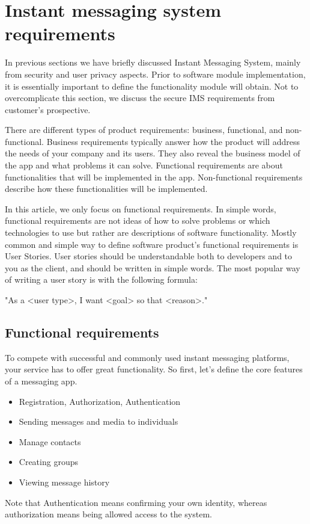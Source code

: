 \chapter{Instant messaging system requirements}\label{ch:instant-messaging-system-requirements}

In previous sections we have briefly discussed Instant Messaging System, mainly from security and user privacy aspects.
Prior to software module implementation, it is essentially important to define the functionality module will obtain.
Not to overcomplicate this section, we discuss the secure IMS requirements from customer's prospective.

There are different types of product requirements: business, functional, and non-functional.
Business requirements typically answer how the product will address the needs of your company and its users.
They also reveal the business model of the app and what problems it can solve.
Functional requirements are about functionalities that will be implemented in the app.
Non-functional requirements describe how these functionalities will be implemented.

In this article, we only focus on functional requirements.
In simple words, functional requirements are not ideas of how to solve problems or which technologies to use but rather
are descriptions of software functionality.
Mostly common and simple way to define software product's functional requirements is User Stories.
User stories should be understandable both to developers and to you as the client, and should be written in simple words.
The most popular way of writing a user story is with the following formula:

\begin{center}
    "As a <user type>, I want <goal> so that <reason>."
\end{center}


\section{Functional requirements}\label{sec:functional-requirements}
To compete with successful and commonly used instant messaging platforms, your service has to offer great functionality.
So first, let’s define the core features of a messaging app.

\begin{itemize}
    \item Registration, Authorization, Authentication
    \item Sending messages and media to individuals
    \item Manage contacts
    \item Creating groups
    \item Viewing message history
\end{itemize}
Note that Authentication means confirming your own identity, whereas authorization means being allowed access to the system.

